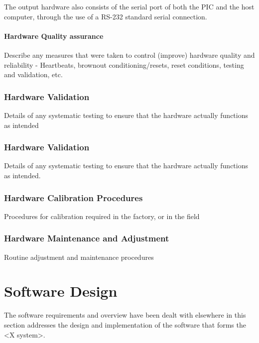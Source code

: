 \documentclass[]{report}
\begin{document}
The output hardware also consists of the serial port of both the PIC and the host computer, through the use of a RS-232 standard serial connection.


\subsubsection{Hardware Quality assurance}
Describe any measures that were taken to control (improve) hardware quality and reliability - Heartbeats, brownout conditioning/resets, reset conditions, testing and validation, etc.

\subsection{Hardware Validation}
Details of any systematic testing to ensure that the hardware actually functions as intended

\subsection{Hardware Validation}
Details of any systematic testing to ensure that the hardware actually functions as intended.

\subsection{Hardware Calibration Procedures}
Procedures for calibration required in the factory, or in the field

\subsection{Hardware Maintenance and Adjustment}
Routine adjustment and maintenance procedures

\chapter{Software Design}
The software requirements and overview have been dealt with elsewhere in this section addresses the design and implementation of the software that forms the <X system>.
\end{document}
